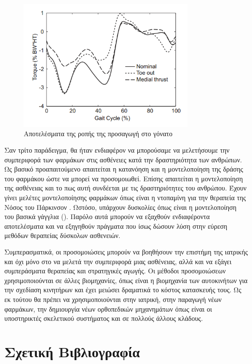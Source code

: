 \begin{figure}[H]
    \centering
    \includegraphics[width=0.8\textwidth, keepaspectratio]{fig/knee-load.png}
    \caption{Αποτελέσματα της ροπής της προσαγωγή στο γόνατο \cite{fregly07}}
    \label{fig:knee-load}
\end{figure}

Σαν τρίτο παράδειγμα, θα ήταν ενδιαφέρον να μπορούσαμε να μελετήσουμε την συμπεριφορά των φαρμάκων στις ασθένειες κατά την δραστηριότητα των ανθρώπων. Ως βασικό προαπαιτούμενο απαιτείται η κατανόηση και η μοντελοποίηση της δράσης του φαρμάκου ώστε να μπορεί να προσομοιωθεί. Επίσης απαιτείται η μοντελοποίηση της ασθένειας και το πως αυτή συνδέεται με τις δραστηριότητες του ανθρώπου. Έχουν γίνει μελέτες μοντελοποίησης φαρμάκων όπως είναι η ντοπαμίνη για την θεραπεία της Νόσος του Πάρκινσον \cite{haeri05}. Ωστόσο, υπάρχουν δυσκολίες όπως είναι η μοντελοποίηση του βασικά γάγγλια (). Παρόλο αυτά μπορούν να εξαχθούν ενδιαφέροντα αποτελέσματα και να εξηγηθούν πράγματα που ίσως δώσουν λύση στην εύρεση μεθόδων θεραπείας δύσκολων ασθενειών.

Συμπερασματικά, οι προσομοιώσεις μπορούν να βοηθήσουν την επιστήμη της ιατρικής και όχι μόνο στο να μελετά την συμπεριφορά μιας ασθένειας, αλλά και να εξάγει συμπεράσματα θεραπείας και στρατηγικές αγωγής. Οι μέθοδοι προσομοιώσεων χρησιμοποιούνται σε άλλες βιομηχανίες, όπως είναι η βιομηχανία των αυτοκινήτων για την σχεδίαση κινητήρων και έχει μειώσει δραματικά το κόστος κατασκευής τους. Ως εκ τούτου θα πρέπει να χρησιμοποιούνται στην ιατρική, στην παραγωγή νέων φαρμάκων, την δημιουργία νέων ορθοπεδικών μηχανημάτων όπως είναι οι υποστηρικτές σκελετικού συστήματος \cite{stopforth12} και σε πολλούς άλλους κλάδους.

\section*{Σχετική Βιβλιογραφία}


